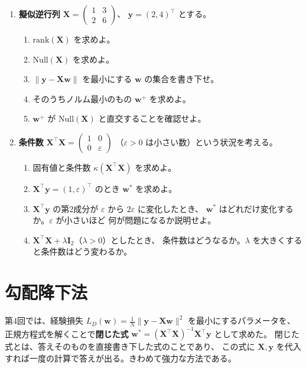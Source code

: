 \begin{enumerate}
  \item \textbf{擬似逆行列}\quad
    $\bm{X} = \begin{pmatrix} 1 & 3 \\ 2 & 6 \end{pmatrix}$、
    $\bm{y} = (2, 4)^\top$ とする。
    \begin{enumerate}
      \item $\mathrm{rank}(\bm{X})$ を求めよ。
      \item $\mathrm{Null}(\bm{X})$ を求めよ。
      \item $\|\bm{y} - \bm{X}\bm{w}\|$ を最小にする $\bm{w}$ の集合を書き下せ。
      \item そのうちノルム最小のもの $\bm{w}^{+}$ を求めよ。
      \item $\bm{w}^{+}$ が $\mathrm{Null}(\bm{X})$ と直交することを確認せよ。
    \end{enumerate}

  \item \textbf{条件数}\quad
    $\bm{X}^\top\bm{X} = \begin{pmatrix} 1 & 0 \\ 0 & \varepsilon \end{pmatrix}$
    （$\varepsilon > 0$ は小さい数）という状況を考える。
    \begin{enumerate}
      \item 固有値と条件数 $\kappa(\bm{X}^\top\bm{X})$ を求めよ。
      \item $\bm{X}^\top\bm{y} = (1, \varepsilon)^\top$ のとき $\bm{w}^*$ を求めよ。
      \item $\bm{X}^\top\bm{y}$ の第2成分が $\varepsilon$ から $2\varepsilon$ に変化したとき、
        $\bm{w}^*$ はどれだけ変化するか。$\varepsilon$ が小さいほど
        何が問題になるか説明せよ。
      \item $\bm{X}^\top\bm{X} + \lambda\bm{I}_2$（$\lambda > 0$）としたとき、
        条件数はどうなるか。$\lambda$ を大きくすると条件数はどう変わるか。
    \end{enumerate}

\end{enumerate}


\section{勾配降下法}

第4回では、経験損失 $L_D(\bm{w}) = \frac{1}{N}\|\bm{y} - \bm{X}\bm{w}\|^2$ を最小にするパラメータを、
正規方程式を解くことで\textbf{閉じた式} $\bm{w}^* = (\bm{X}^\top\bm{X})^{-1}\bm{X}^\top\bm{y}$ として求めた。
閉じた式とは、答えそのものを直接書き下した式のことであり、
この式に $\bm{X}, \bm{y}$ を代入すれば一度の計算で答えが出る。きわめて強力な方法である。

